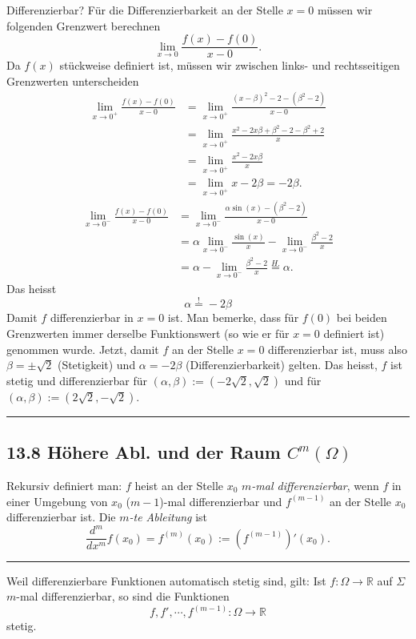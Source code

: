 \documentclass[a4paper,landscape,8pt]{extarticle}
\newcommand{\R}{\mathbb{R}}
\newcommand{\sep}{\vspace{5pt}\noindent\hrule\vspace{5pt}}
\begin{document}
\begin{multicols*}{4}
\begin{warmup}
Differenzierbar? Für die Differenzierbarkeit an der Stelle $x=0$ müssen wir
folgenden Grenzwert berechnen \[ \lim_{x\to 0} \frac{f(x)-f(0)}{x-0}.
\] Da $f(x)$ stückweise definiert ist, müssen wir zwischen links- und
rechtsseitigen Grenzwerten unterscheiden
\begin{align*}
\lim_{x\to 0^+} \frac{f(x)-f(0)}{x-0}
&= \lim_{x\to 0^+}\frac{(x-\beta)^2-2-(\beta^2-2)}{x-0}\\
&= \lim_{x\to 0^+}\frac{x^2-2x\beta +\beta^2 -2 -\beta^2 + 2}{x}\\
&= \lim_{x\to 0^+}\frac{x^2-2x\beta}{x}\\
&= \lim_{x\to 0^+} x-2\beta = -2\beta.
\end{align*}
\begin{align*}
\lim_{x\to 0^-} \frac{f(x)-f(0)}{x-0}
&= \lim_{x\to 0^-} \frac{\alpha\sin(x) - (\beta^2 -2)} {x-0}\\
&= \alpha \lim_{x\to 0^-} \frac{\sin(x)}{x} - \lim_{x\to0^-}
\frac{\beta^2-2}{x}\\
&= \alpha - \lim_{x\to0^-}\frac{\beta^2-2}{x} \stackrel{H.}{=} \alpha.
\end{align*}
Das heisst
\[
\alpha\stackrel{!}{=}-2\beta
\]
Damit $f$ differenzierbar in $x=0$ ist. Man bemerke, dass für $f(0)$ bei beiden
Grenzwerten immer derselbe Funktionswert (so wie er für $x=0$ definiert ist)
genommen wurde. Jetzt, damit $f$ an der Stelle $x=0$ differenzierbar ist, muss
also $\beta=\pm\sqrt{2}$ (Stetigkeit) und $\alpha=-2\beta$ (Differenzierbarkeit)
gelten. Das heisst, $f$ ist stetig und differenzierbar für
$(\alpha,\beta):=(-2\sqrt{2},\sqrt{2})$ und für
$(\alpha,\beta):=(2\sqrt{2},-\sqrt{2})$.

\sep
\end{warmup}

\subsection{13.8 Höhere Abl. und der Raum $C^m(\Omega)$}

\Def Rekursiv definiert man: $f$ heist an der Stelle $x_0$ $m$\emph{-mal
differenzierbar}, wenn $f$ in einer Umgebung von $x_0$ ($m-1$)-mal
differenzierbar und $f^{(m-1)}$ an der Stelle $x_0$ differenzierbar ist. Die
$m$\emph{-te Ableitung} ist
\[
\frac{d^m}{dx^m}f(x_0) = f^{(m)}(x_0) := (f^{(m-1)})'(x_0).
\]

\sep

\Satz Weil differenzierbare Funktionen automatisch stetig sind, gilt: Ist
$f\colon\Omega\to\R$ auf $\Sigma$ $m$-mal differenzierbar, so sind die
Funktionen
\[
f, f', \cdots, f^{(m-1)} \colon \Omega\to\R
\]
stetig.


\end{multicols*}
\end{document}
